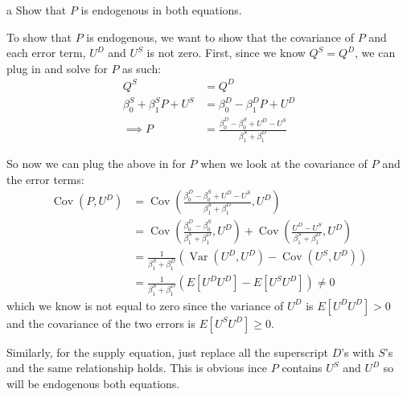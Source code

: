 \documentclass{article}
\begin{document}
\begin{problem}{a}
Show that $P$ is endogenous in both equations.
\end{problem}
\begin{solution}
To show that $P$ is endogenous, we want to show that the covariance of $P$ and each error term, $U^D$ and $U^S$ is not zero. First, since we know $Q^S=Q^D$, we can plug in and solve for $P$ as such:
\begin{align*}
    Q^S &= Q^D \\
    \beta_{0}^{S}+\beta_{1}^{S} P+U^{S} &= \beta_{0}^{D}-\beta_{1}^{D} P+U^{D}\\
    \implies P &= \frac{\beta_{0}^{D} - \beta_{0}^{S} + U^D - U^S}{\beta_1^S+\beta_1^D}
\end{align*}

So now we can plug the above in for $P$ when we look at the covariance of $P$ and the error terms:
\begin{align*}
    \operatorname{Cov}(P,U^D) &= \operatorname{Cov}\left(\frac{\beta_{0}^{D} - \beta_{0}^{S} + U^D - U^S}{\beta_1^S+\beta_1^D}, U^D \right) \\
    &= \operatorname{Cov}\left(\frac{\beta_{0}^{D} - \beta_{0}^{S}}{\beta_1^S+\beta_1^D}, U^D \right) + \operatorname{Cov}\left( \frac{U^D - U^S}{\beta_1^S+\beta_1^D}, U^D \right) \\
    &= \frac{1}{\beta_1^S+\beta_1^D} \left( \operatorname{Var}\left(U^D, U^D \right) - \operatorname{Cov}\left(U^S, U^D \right) \right) \\
    &= \frac{1}{\beta_1^S+\beta_1^D} \left( E[U^D U^D] - E[U^S U^D] \right) \neq 0
\end{align*}
which we know is not equal to zero since the variance of $U^D$ is $E[U^D U^D]>0$ and the covariance of the two errors is $E[U^S U^D]\geq0$.

Similarly, for the supply equation, just replace all the superscript $D$'s with $S$'s and the same relationship holds. This is obvious ince $P$ contains $U^S$ and $U^D$ so will be endogenous both equations.
\end{solution}
\end{document}
